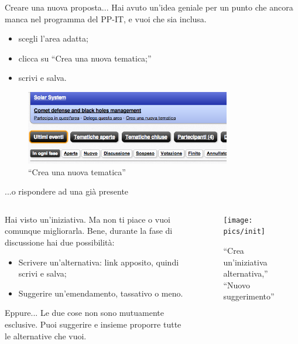\begin{frame}{Creare una nuova proposta... }
Hai avuto un'idea geniale per un punto che ancora manca nel programma del PP-IT, e vuoi che sia inclusa.
\begin{itemize}\item scegli l'area adatta;\item clicca su ``Crea una nuova tematica;''\item scrivi e salva.\end{itemize}
\begin{figure}\includegraphics[width=0.8\textwidth]{pics/partecipa}
\caption{``Crea una nuova tematica''}
\end{figure}
\end{frame}

\begin{frame}{...o rispondere ad una già presente}
\begin{columns}
\begin{column}{.5\textwidth}Hai visto un'iniziativa. Ma non ti piace o vuoi comunque migliorarla. Bene, durante la fase di discussione hai due possibilità:\begin{itemize}\item Scrivere un'alternativa: link apposito, quindi scrivi e salva; \item Suggerire un'emendamento, tassativo o meno. \end{itemize}
\begin{block}{Eppure...}
Le due cose non sono mutuamente esclusive. Puoi suggerire e insieme proporre tutte le alternative che vuoi. 
\end{block}
\end{column}
\begin{column}{.5\textwidth}\begin{figure}\texttt{[image: pics/init]}
\caption{``Crea un'iniziativa alternativa,'' ``Nuovo suggerimento''}
\end{figure}\end{column}
\end{columns}
\end{frame}


